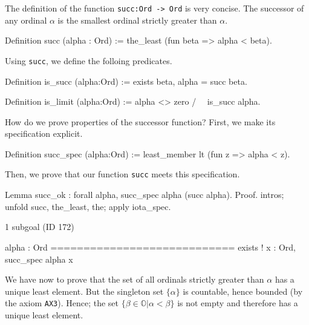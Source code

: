 {The definition of the function \texttt{succ:Ord -> Ord} is very concise. The successor of any ordinal $\alpha$ is the smallest ordinal strictly greater than $\alpha$.

\label{Functions:succ-sch}

\begin{Coqsrc}
Definition succ (alpha : Ord) := the_least (fun beta => alpha < beta).
\end{Coqsrc}

Using \texttt{succ}, we define the folloing predicates.

\begin{Coqsrc}
Definition is_succ (alpha:Ord) := exists beta, alpha = succ beta.

Definition is_limit (alpha:Ord) := alpha <> zero /\ ~ is_succ alpha.
\end{Coqsrc}




How do we prove properties of the successor function?
First, we make its specification explicit.

\begin{Coqsrc}
Definition succ_spec (alpha:Ord) :=
  least_member   lt (fun z => alpha < z).
\end{Coqsrc}

Then, we prove that our function \texttt{succ} meets this specification. 


\begin{Coqsrc}
Lemma succ_ok : forall alpha,  succ_spec alpha  (succ alpha).
Proof.
  intros; unfold succ, the_least, the;  apply iota_spec.
\end{Coqsrc}

\begin{Coqanswer}
1 subgoal (ID 172)
  
  alpha : Ord
  ============================
  exists ! x : Ord, succ_spec alpha x
\end{Coqanswer}

We have now to prove that the set of all ordinals strictly greater than $\alpha$ has a unique least element. But the singleton set $\{\alpha\}$ is countable, hence  bounded (by the axiom \texttt{AX3}). Hence; the set $\{\beta\in\mathbb{O}|\alpha < \beta\}$ is not empty
and therefore has a unique least element.

}
